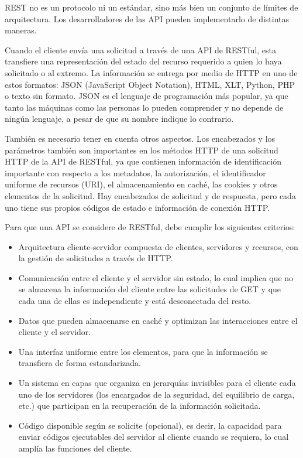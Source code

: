 \cite{redhat}REST no es un protocolo ni un estándar, sino más bien un conjunto de límites de arquitectura. Los desarrolladores de las API pueden implementarlo de distintas maneras.

Cuando el cliente envía una solicitud a través de una API de RESTful, esta transfiere una representación del estado del recurso requerido a quien lo haya solicitado o al extremo. La información se entrega por medio de HTTP en uno de estos formatos: JSON (JavaScript Object Notation), HTML, XLT, Python, PHP o texto sin formato. JSON es el lenguaje de programación más popular, ya que tanto las máquinas como las personas lo pueden comprender y no depende de ningún lenguaje, a pesar de que su nombre indique lo contrario. 

También es necesario tener en cuenta otros aspectos. Los encabezados y los parámetros también son importantes en los métodos HTTP de una solicitud HTTP de la API de RESTful, ya que contienen información de identificación importante con respecto a los metadatos, la autorización, el identificador uniforme de recursos (URI), el almacenamiento en caché, las cookies y otros elementos de la solicitud. Hay encabezados de solicitud y de respuesta, pero cada uno tiene sus propios códigos de estado e información de conexión HTTP.

Para que una API se considere de RESTful, debe cumplir los siguientes criterios:

\begin{itemize}
	\item Arquitectura cliente-servidor compuesta de clientes, servidores y recursos, con la gestión de solicitudes a través de HTTP.
	\item Comunicación entre el cliente y el servidor sin estado, lo cual implica que no se almacena la información del cliente entre las solicitudes de GET y que cada una de ellas es independiente y está desconectada del resto.
	\item Datos que pueden almacenarse en caché y optimizan las interacciones entre el cliente y el servidor.
	\item Una interfaz uniforme entre los elementos, para que la información se transfiera de forma estandarizada.
	\item Un sistema en capas que organiza en jerarquías invisibles para el cliente cada uno de los servidores (los encargados de la seguridad, del equilibrio de carga, etc.) que participan en la recuperación de la información solicitada.
	\item Código disponible según se solicite (opcional), es decir, la capacidad para enviar códigos ejecutables del servidor al cliente cuando se requiera, lo cual amplía las funciones del cliente. 
\end{itemize}

